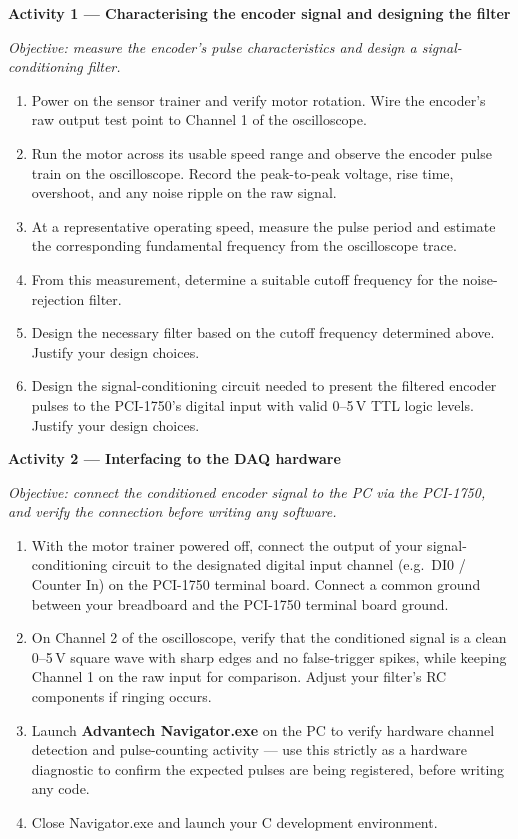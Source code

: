 \begin{procedure}

  \textbf{Activity 1 --- Characterising the encoder signal and designing the filter}\vspace{2pt}

  \textit{Objective: measure the encoder's pulse characteristics and design a signal-conditioning filter.}

  \begin{enumerate}
    \item Power on the sensor trainer and verify motor rotation. Wire the encoder's raw output test point to Channel 1 of the oscilloscope.
    \item Run the motor across its usable speed range and observe the encoder pulse train on the oscilloscope. Record the peak-to-peak voltage, rise time, overshoot, and any noise ripple on the raw signal.
    \item At a representative operating speed, measure the pulse period and estimate the corresponding fundamental frequency from the oscilloscope trace.
    \item From this measurement, determine a suitable cutoff frequency for the noise-rejection filter.
    \item Design the necessary filter based on the cutoff frequency determined above. Justify your design choices.
    \item Design the signal-conditioning circuit needed to present the filtered encoder pulses to the PCI-1750's digital input with valid 0--5\,V TTL logic levels. Justify your design choices.
  \end{enumerate}

  \textbf{Activity 2 --- Interfacing to the DAQ hardware}\vspace{2pt}

  \textit{Objective: connect the conditioned encoder signal to the PC via the PCI-1750, and verify the connection before writing any software.}

  \begin{enumerate}
    \item With the motor trainer powered off, connect the output of your signal-conditioning circuit to the designated digital input channel (e.g.\ DI0 / Counter In) on the PCI-1750 terminal board. Connect a common ground between your breadboard and the PCI-1750 terminal board ground.
    \item On Channel 2 of the oscilloscope, verify that the conditioned signal is a clean 0--5\,V square wave with sharp edges and no false-trigger spikes, while keeping Channel 1 on the raw input for comparison. Adjust your filter's RC components if ringing occurs.
    \item Launch \textbf{Advantech Navigator.exe} on the PC to verify hardware channel detection and pulse-counting activity --- use this strictly as a hardware diagnostic to confirm the expected pulses are being registered, before writing any code.
    \item Close Navigator.exe and launch your C development environment.
  \end{enumerate}


\end{procedure}
